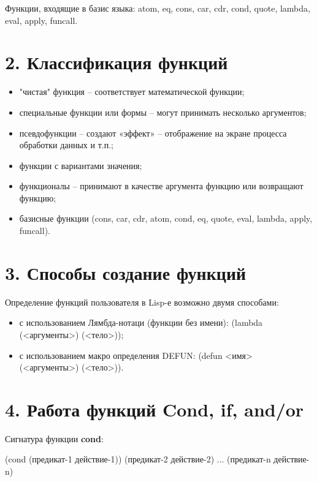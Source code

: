 \documentclass[12pt]{report}
\begin{document}
Функции, входящие в базис языка: atom, eq, cons, car, cdr, cond, quote, lambda, eval, apply, funcall.


\section*{2. Классификация функций}

\begin{itemize}
	\item "чистая" функция -- соответствует математической функции;
	\item специальные функции или формы -- могут принимать несколько аргументов;
	\item псевдофункции -- создают «эффект» -- отображение на экране процесса обработки данных и т.п.;
	\item функции с вариантами значения;
	\item функционалы -- принимают в качестве аргумента функцию или возвращают функцию;
	\item базисные функции (cons, car, cdr, atom, cond, eq, quote, eval, lambda, apply, funcall).
\end{itemize}

\section*{3. Способы создание функций}

Определение функций пользователя в Lisp-е возможно двумя способами:
\begin{itemize}
	\item с использованием Лямбда-нотаци (функции без имени): (lambda (<аргументы>) (<тело>));
	\item с использованием макро определения DEFUN: (defun <имя> (<аргументы>) (<тело>)).
\end{itemize}

\section*{4. Работа функций Cond, if, and/or}

Сигнатура функции \textbf{cond}:

\indent(cond (предикат-1 действие-1)) \newline
\indent(предикат-2 действие-2) \newline
\indent...\newline
\indent(предикат-n действие-n)\newline
\end{document}
